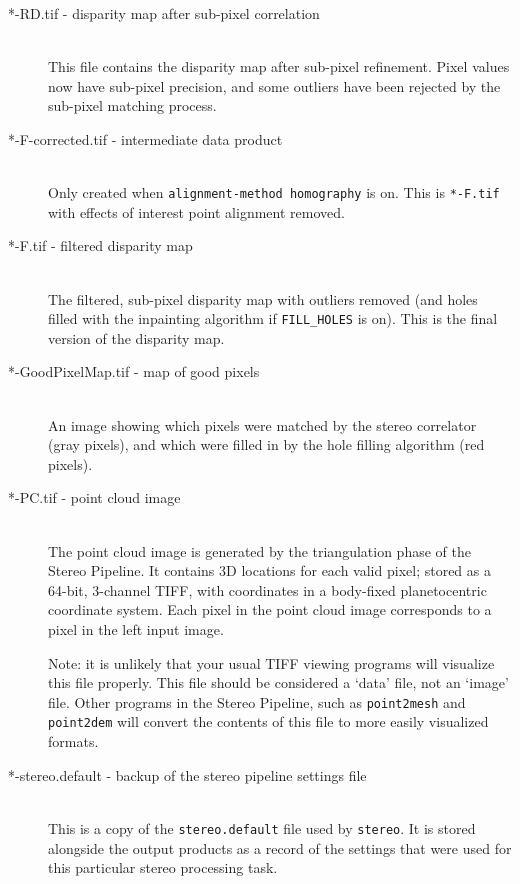\begin{description}
\item[*-RD.tif - \textnormal{disparity map after sub-pixel correlation}] \hfill \\
  This file contains the disparity map after sub-pixel refinement.
  Pixel values now have sub-pixel precision, and some outliers have
  been rejected by the sub-pixel matching process.

\item[*-F-corrected.tif \textnormal{- intermediate data product}] \hfill \\
  Only created when \texttt{alignment-method homography} is on.
  This is \texttt{*-F.tif} with effects of interest point alignment removed.

\item[*-F.tif \textnormal{- filtered disparity map}] \hfill \\
  The filtered, sub-pixel disparity map with outliers removed (and
  holes filled with the inpainting algorithm if \texttt{FILL\_HOLES}
  is on). This is the final version of the disparity map.

\item[*-GoodPixelMap.tif \textnormal{- map of good pixels}] \hfill \\
  An image showing which pixels were matched by the stereo correlator
  (gray pixels), and which were filled in by the hole filling
  algorithm (red pixels).

\item[*-PC.tif \textnormal{- point cloud image}] \hfill \\
  The point cloud image is generated by the triangulation phase of the
  Stereo Pipeline.  It contains 3D locations for each valid pixel;
  stored as a 64-bit, 3-channel TIFF, with coordinates in a body-fixed
  planetocentric coordinate system.  Each pixel in the point cloud
  image corresponds to a pixel in the left input image.

  Note: it is unlikely that your usual TIFF viewing programs will
  visualize this file properly.  This file should be considered a
  `data' file, not an `image' file.  Other programs in the Stereo
  Pipeline, such as {\tt point2mesh} and {\tt point2dem} will convert
  the contents of this file to more easily visualized formats.

\item[*-stereo.default \textnormal{- backup of the stereo pipeline settings file}] \hfill \\
  This is a copy of the \texttt{stereo.default} file used by
  \texttt{stereo}.  It is stored alongside the output products as
  a record of the settings that were used for this particular stereo
  processing task.

\end{description}

